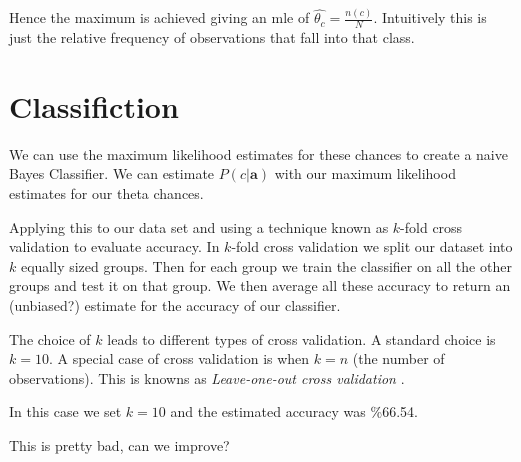 Hence the maximum is achieved giving an mle of $\hat{\theta_c} = \frac{n(c)}{N}$. Intuitively this is just the relative frequency of observations that fall into that class.

\section{Classifiction}

We can use the maximum likelihood estimates for these chances to create a naive Bayes Classifier. We can estimate $P(c|\mathbf{a})$ with our maximum likelihood estimates for our theta chances.

Applying this to our data set and using a technique known as $k$-fold cross validation to evaluate accuracy. In $k$-fold cross validation we split our dataset into $k$ equally sized groups. Then for each group we train the classifier on all the other groups and test it on that group. We then average all these accuracy to return an (unbiased?) estimate for the accuracy of our classifier.

The choice of $k$ leads to different types of cross validation. A standard choice is $k=10$. A special case of cross validation is when $k=n$ (the number of observations). This is knowns as \textit{Leave-one-out cross validation} \cite{Priddy05}.

In this case we set $k=10$ and the estimated accuracy was \%66.54.

This is pretty bad, can we improve?